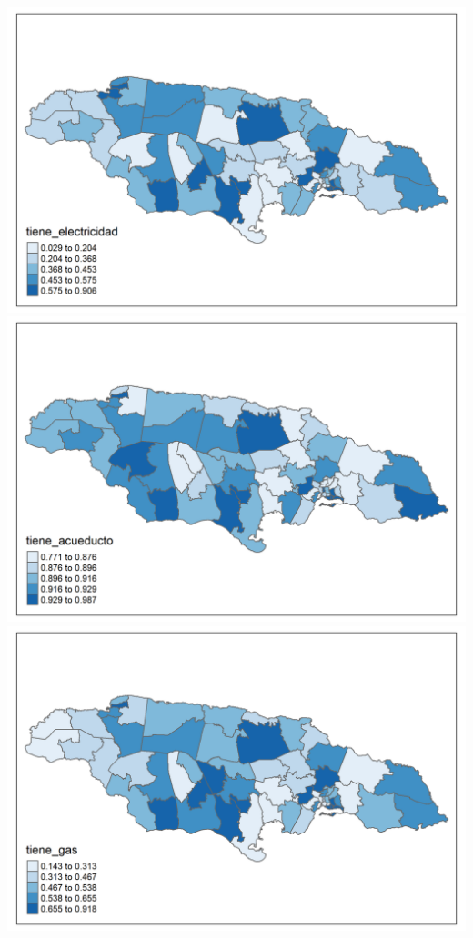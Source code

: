 \documentclass[
  12pt,
]{book}
\begin{document}
\includegraphics[width=4\linewidth]{Recursos/01_Session1/18_plot_Censo/tiene_electricidad}
\includegraphics[width=4\linewidth]{Recursos/01_Session1/18_plot_Censo/tiene_acueducto}
\includegraphics[width=4\linewidth]{Recursos/01_Session1/18_plot_Censo/tiene_gas}
\end{document}
